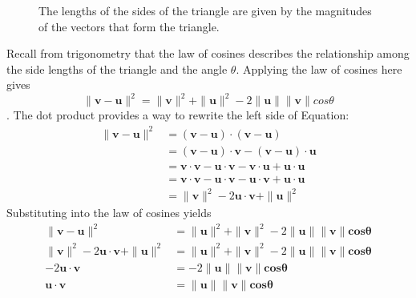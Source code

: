 \documentclass[oneside]{book}
\begin{document}
{{\begin{figure}[H]
\begin{center}
            \end{center}
            \caption{The lengths of the sides of the triangle are given by the magnitudes of the vectors that form the triangle.}
        \end{figure}
        Recall from trigonometry that the law of cosines describes the relationship among the side lengths of the triangle and the angle $\theta$. Applying the law of cosines here gives
        $$\|\mathbf{v-u}\|^{2}=\|\mathbf{v}\|^{2}+\|\mathbf{u}\|^{2}-2\|\mathbf{u}\|\|\mathbf{v}\|cos\theta$$.
        The dot product provides a way to rewrite the left side of Equation:
        \begin{align}
            \|\mathbf{v-u}\|^{2}&=(\mathbf{v-u})\cdot(\mathbf{v-u})\\
                                &=(\mathbf{v-u})\cdot\mathbf{v}-(\mathbf{v-u})\cdot\mathbf{u}\\
                                &=\mathbf{v}\cdot\mathbf{v}-\mathbf{u}\cdot\mathbf{v}-\mathbf{v}\cdot\mathbf{u}+\mathbf{u}\cdot\mathbf{u}\\
                                &=\mathbf{v}\cdot\mathbf{v}-\mathbf{u}\cdot\mathbf{v}-\mathbf{u}\cdot\mathbf{v}+\mathbf{u}\cdot\mathbf{u}\\
                                &=\|\mathbf{v}\|^{2}-2\mathbf{u}\cdot\mathbf{v}+\|\mathbf{u}\|^{2}
        \end{align}
        Substituting into the law of cosines yields
        \begin{align}
            \|\mathbf{v-u}\|^{2}&=\|\mathbf{u}\|^{2}+\|\mathbf{v}\|^{2}-2\|\mathbf{u}\|\|\mathbf{v}\|\mathbf{cos\theta}\\            \|\mathbf{v}\|^{2}-2\mathbf{u}\cdot\mathbf{v}+\|\mathbf{u}\|^{2}&=\|\mathbf{u}\|^{2}+\|\mathbf{v}\|^{2}-2\|\mathbf{u}\|\|\mathbf{v}\|\mathbf{cos\theta}\\
            -2\mathbf{u}\cdot\mathbf{v}&=-2\|\mathbf{u}\|\|\mathbf{v}\|\mathbf{cos\theta}\\
            \mathbf{u}\cdot\mathbf{v}&=\|\mathbf{u}\|\|\mathbf{v}\|\mathbf{cos\theta}
        \end{align}
    }


}
\end{document}
